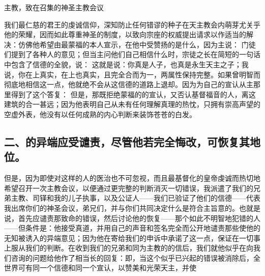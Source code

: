 主教，致在召集的神圣主教会议\par

我们最仁慈的君王的虔诚信仰，深知防止任何错谬的种子在天主教会内萌芽尤关乎他的荣耀，因而如此尊重神圣的制度，以致向宗座的权威提出请求以作适当的解决：仿佛他希望由最蒙福的本人宣示，在他中受赞扬的是什么，因为主说： 门徒们提到了各种人的意见；但当主问他们自己相信什么时，宗徒之长在简短的一句话中包含了信德的全貌，说： 这就是说：你真是人子，也真是永生天主之子；我说，你在上真实，在上也真实，且完全合而为一，两属性保持完整。如果曾明智而彻底地相信这一点，他就绝不会从这信德的道路上退却。因为为自己的宣认从主那里得到了这个答复： 但是，那既拒绝蒙福的的宣认，又否认基督福音的人，离这建筑的合一甚远；因为他表明自己从未有任何理解真理的热忱，只拥有崇高声望的空虚外表，他没有以任何成熟的内心判断来装饰苍苍的白发。\par


\subsection{二、的异端应受谴责，尽管他若完全悔改，可恢复其地位。}

但是，因为即使对这样的人的医治也不可忽视，而且最基督化的皇帝虔诚而热切地希望召开一次主教会议，以便通过更完整的判断消灭一切错误，我派遣了我们的兄弟主教、司铎和我的儿子执事，以及公证人——我们已验证了他们的信德——代表我出席你们的神圣会议，弟兄们，并与你们共同决定什么是符合主旨意的。也就是说，首先应谴责那致命的错误，然后讨论他的恢复——那个如此不明智地犯错的人——但条件是：他接受真道，并用自己的声音和签名完全而公开地谴责那些使他的无知被诱入的异端意见；因为他在寄给我们的申诉中承诺了这一点，保证在一切事上服从我们的判断。在收到我们的兄弟和同为主教的的信后，我们就他似乎在向我们咨询的问题给他作了相当长的回复：即，当这个似乎已兴起的错误被消除后，全世界可有同一个信德和同一个宣认，以赞美和光荣天主，并使 \par

